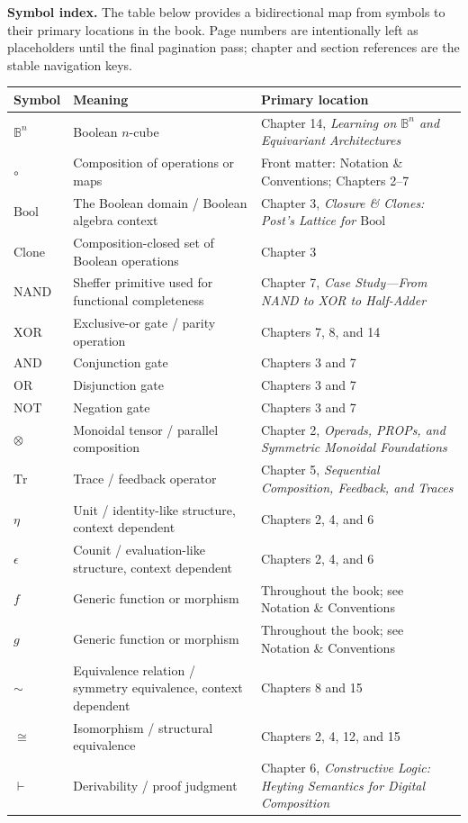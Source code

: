 \medskip

\noindent\textbf{Symbol index.} The table below provides a bidirectional map from symbols to their primary locations in the book. Page numbers are intentionally left as placeholders until the final pagination pass; chapter and section references are the stable navigation keys.

\begin{center}
\begin{tabular}{@{}lll@{}}
\hline
Symbol & Meaning & Primary location \\
\hline
\(\mathbb{B}^n\) & Boolean \(n\)-cube & Chapter 14, \emph{Learning on \(\mathbb{B}^n\) and Equivariant Architectures} \\
\(\circ\) & Composition of operations or maps & Front matter: Notation \& Conventions; Chapters 2--7 \\
\(\mathrm{Bool}\) & The Boolean domain / Boolean algebra context & Chapter 3, \emph{Closure \& Clones: Post's Lattice for \(\mathrm{Bool}\)} \\
\(\mathrm{Clone}\) & Composition-closed set of Boolean operations & Chapter 3 \\
\(\mathrm{NAND}\) & Sheffer primitive used for functional completeness & Chapter 7, \emph{Case Study---From NAND to XOR to Half-Adder} \\
\(\mathrm{XOR}\) & Exclusive-or gate / parity operation & Chapters 7, 8, and 14 \\
\(\mathrm{AND}\) & Conjunction gate & Chapters 3 and 7 \\
\(\mathrm{OR}\) & Disjunction gate & Chapters 3 and 7 \\
\(\mathrm{NOT}\) & Negation gate & Chapters 3 and 7 \\
\(\otimes\) & Monoidal tensor / parallel composition & Chapter 2, \emph{Operads, PROPs, and Symmetric Monoidal Foundations} \\
\(\mathrm{Tr}\) & Trace / feedback operator & Chapter 5, \emph{Sequential Composition, Feedback, and Traces} \\
\(\eta\) & Unit / identity-like structure, context dependent & Chapters 2, 4, and 6 \\
\(\epsilon\) & Counit / evaluation-like structure, context dependent & Chapters 2, 4, and 6 \\
\(f\) & Generic function or morphism & Throughout the book; see Notation \& Conventions \\
\(g\) & Generic function or morphism & Throughout the book; see Notation \& Conventions \\
\(\sim\) & Equivalence relation / symmetry equivalence, context dependent & Chapters 8 and 15 \\
\(\cong\) & Isomorphism / structural equivalence & Chapters 2, 4, 12, and 15 \\
\(\vdash\) & Derivability / proof judgment & Chapter 6, \emph{Constructive Logic: Heyting Semantics for Digital Composition} \\
\hline
\end{tabular}
\end{center}

